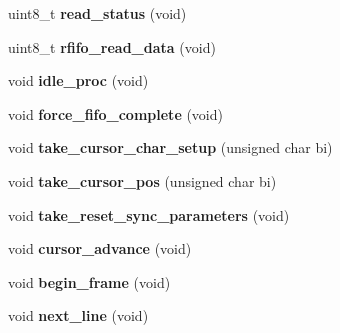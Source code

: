 \begin{DoxyCompactItemize}
\item 
\hypertarget{structPC98__GDC__state_af5efa59d1f87f1a172c4fd86e0367ab0}{uint8\-\_\-t {\bfseries read\-\_\-status} (void)}\label{structPC98__GDC__state_af5efa59d1f87f1a172c4fd86e0367ab0}

\item 
\hypertarget{structPC98__GDC__state_a7d6b362a6b895d3a1e7636de691e0e00}{uint8\-\_\-t {\bfseries rfifo\-\_\-read\-\_\-data} (void)}\label{structPC98__GDC__state_a7d6b362a6b895d3a1e7636de691e0e00}

\item 
\hypertarget{structPC98__GDC__state_a0ccae08dcb56ec0101cc2d4cfd157eb1}{void {\bfseries idle\-\_\-proc} (void)}\label{structPC98__GDC__state_a0ccae08dcb56ec0101cc2d4cfd157eb1}

\item 
\hypertarget{structPC98__GDC__state_ae84ccc228e028cda626d6daf99f87838}{void {\bfseries force\-\_\-fifo\-\_\-complete} (void)}\label{structPC98__GDC__state_ae84ccc228e028cda626d6daf99f87838}

\item 
\hypertarget{structPC98__GDC__state_a6ba4e40ce3639a48cfbadba1872df0d0}{void {\bfseries take\-\_\-cursor\-\_\-char\-\_\-setup} (unsigned char bi)}\label{structPC98__GDC__state_a6ba4e40ce3639a48cfbadba1872df0d0}

\item 
\hypertarget{structPC98__GDC__state_a80e0ea7ab57f9fc28dd8bd1f50d71be1}{void {\bfseries take\-\_\-cursor\-\_\-pos} (unsigned char bi)}\label{structPC98__GDC__state_a80e0ea7ab57f9fc28dd8bd1f50d71be1}

\item 
\hypertarget{structPC98__GDC__state_af2b09ec20b24e73d7db449705d1f2ec8}{void {\bfseries take\-\_\-reset\-\_\-sync\-\_\-parameters} (void)}\label{structPC98__GDC__state_af2b09ec20b24e73d7db449705d1f2ec8}

\item 
\hypertarget{structPC98__GDC__state_a391cd10c2a662e20d413727c48000af3}{void {\bfseries cursor\-\_\-advance} (void)}\label{structPC98__GDC__state_a391cd10c2a662e20d413727c48000af3}

\item 
\hypertarget{structPC98__GDC__state_ac85b9bb3a3bbd0b4f66de944483d8424}{void {\bfseries begin\-\_\-frame} (void)}\label{structPC98__GDC__state_ac85b9bb3a3bbd0b4f66de944483d8424}

\item 
\hypertarget{structPC98__GDC__state_ab65b859c51a1a67e418519493d965cf2}{void {\bfseries next\-\_\-line} (void)}\label{structPC98__GDC__state_ab65b859c51a1a67e418519493d965cf2}


\end{DoxyCompactItemize}
